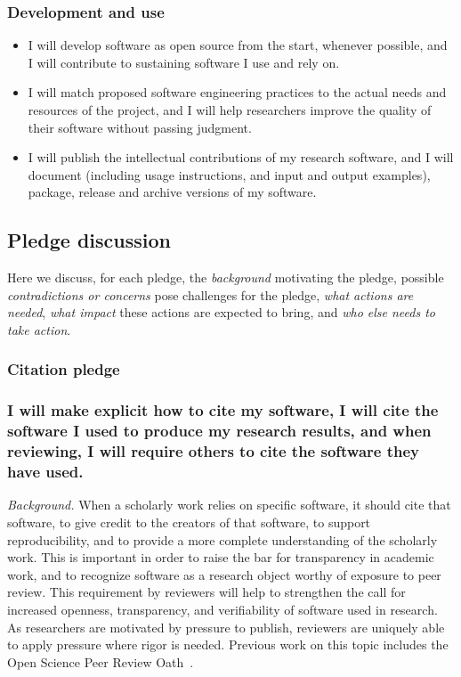 \documentclass[a4paper,UKenglish]{dagman}
\renewcommand{\paragraph}[1]{\subsubsection*{#1}\xspace}
\begin{document}
\paragraph{Development and use}
\begin{itemize}
\item I will develop software as open source from the start, whenever possible, and I will contribute to sustaining software I use and rely on.
\item I will match proposed software engineering practices to the actual needs and resources of the project, and I will help researchers improve the quality of their software without passing judgment.
\item I will publish the intellectual contributions of my research software, and I will document (including usage instructions, and input and output examples), package, release and archive versions of my software.
\end{itemize}

\clearpage
\subsection{Pledge discussion}

Here we discuss, for each pledge, the \emph{background} motivating the pledge, possible \emph{contradictions or concerns} pose challenges for the pledge, \emph{what actions are needed}, \emph{what impact} these actions are expected to bring, and \emph{who else needs to take action}.



\subsubsection*{Citation pledge}

\paragraph{I will make explicit how to cite my software, I will cite the software I used to produce my research results, and when reviewing, I will require others to cite the software they have used.}

\emph{Background.} When a scholarly work relies on specific software, it should cite that software, to give credit to the creators of that software, to support reproducibility, and to provide a more complete understanding of the scholarly work.
This is important in order to raise the bar for transparency in academic work, and to recognize software as a research object worthy of exposure to peer review. This requirement by reviewers will help to strengthen the call for increased openness, transparency, and verifiability of software used in research. As researchers are motivated by pressure to publish, reviewers are uniquely able to apply pressure where rigor is needed. Previous work on this topic includes the Open Science Peer Review Oath~\cite{aleksic_open_2015}.
\end{document}
